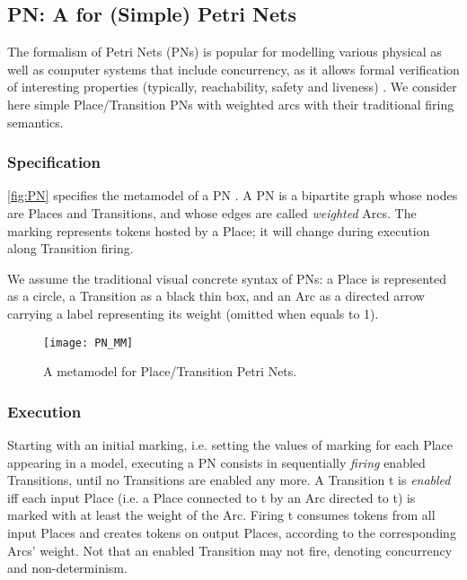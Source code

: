 \subsection{\textsf{PN}: A \DSL for (Simple) Petri Nets}
\label{sec:Examples:PN}

The formalism of Petri Nets (PNs) is popular for modelling various physical as well as
computer systems that include concurrency, as it allows formal verification of 
interesting properties (typically, reachability, safety and liveness)
\cite{B:He-Murata:2005}. We consider here simple Place/Transition PNs with weighted
arcs with their traditional firing semantics. 

\subsubsection{Specification}
\label{sec:Examples:PN:Specification}

\autoref{fig:PN} specifies the metamodel of a PN \DSL. A \textsf{PN} is a bipartite
graph whose nodes are \textsf{Place}s and \textsf{Transition}s, and whose edges are
called \emph{weighted} \textsf{Arc}s. The \textsf{marking} represents tokens hosted
by a \textsf{Place}; it will change during execution along \textsf{Transition} firing.
 
We assume the traditional visual concrete syntax of PNs: a \textsf{Place} is 
represented as a circle, a \textsf{Transition} as a black thin box, and an 
\textsf{Arc} as a directed arrow carrying a label representing its \textsf{weight}
(omitted when equals to 1).

\begin{figure}%
   \texttt{[image: PN\_MM]}%
   \caption{A metamodel for Place/Transition Petri Nets.}%
   \label{fig:PN}%
\end{figure}



\subsubsection{Execution}
\label{sec:Examples:PN:Execution}

Starting with an initial marking, i.e. setting the values of \textsf{marking} for
each \textsf{Place} appearing in a model, executing a \textsf{PN} consists in 
sequentially \emph{firing} enabled \textsf{Transition}s, until no 
\textsf{Transition}s are enabled any more. A \textsf{Transition} \textsf{t} is 
\emph{enabled} iff each input \textsf{Place} (i.e. a \textsf{Place} connected to
\textsf{t} by an \textsf{Arc} directed to \textsf{t}) is marked with at least the
weight of the \textsf{Arc}. Firing \textsf{t} consumes tokens from all input 
\textsf{Place}s and creates tokens on output \textsf{Place}s, according to the
corresponding \textsf{Arc}s' \textsf{weight}. Not that an enabled \textsf{Transition}
may not fire, denoting concurrency and non-determinism.

